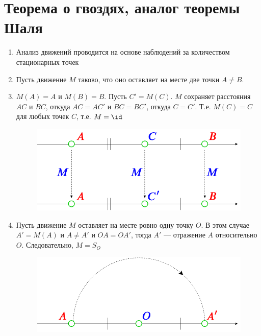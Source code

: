 \section{Теорема о гвоздях, аналог теоремы Шаля}




\begin{enumerate}
\item Анализ движений проводится на основе наблюдений за количеством стационарных точек
\item Пусть движение $M$ таково, что оно оставляет на месте две точки $A\ne B$.
\item $M(A)=A$ и $M(B)=B$. Пусть $C'=M(C)$. $M$ сохраняет расстояния $AC$ и $BC$, откуда $AC=AC'$ и $BC=BC'$, откуда $C=C'$. Т.е. $M(C)=C$ для любых точек $C$, т.е. $M=\id$

\begin{figure}[hbt!]
\begin{center}
\includegraphics[scale=0.35]{LineMoving.png}
\end{center}
\caption{}\label{LineMoving}
\end{figure}
\item Пусть движение $M$ оставляет на месте ровно одну точку $O$. В этом случае $A'=M(A)$ и $A\ne A'$ и $OA=OA'$, тогда $A'$ --- отражение $A$ относительно $O$. Следовательно, $M=S_O$
\begin{figure}[hbt!]
\begin{center}
\includegraphics[scale=0.35]{LineMovingO.png}
\end{center}
\caption{}\label{LineMovingO}
\end{figure}


\end{enumerate}

